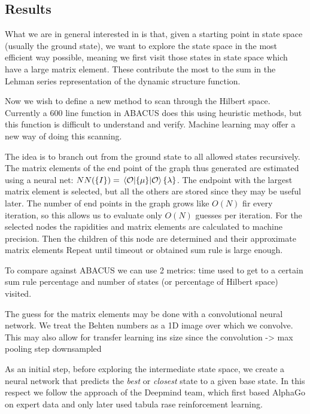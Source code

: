 \documentclass[11pt, a4paper]{report} %
\begin{document}
\subsection{Results}

What we are in general interested in is that, given a starting point in state space (usually the ground state), we want to explore the state space in the most efficient way possible, meaning we first visit those states in state space which have a large matrix element. 
These contribute the most to the sum in the Lehman series representation of the dynamic structure function.





Now we wish to define a new method to scan through the Hilbert space.
Currently a 600 line function in ABACUS does this using heuristic methods, but this function is difficult to understand and verify.
Machine learning may offer a new way of doing this scanning.

The idea is to branch out from the ground state to all allowed states recursively.
The matrix elements of the end point of the graph thus generated are estimated using a neural net: $NN(\{I\}) = \expval{\{\mu\}}{\mathcal{O}}{\{\lambda\}}$.
The endpoint with the largest matrix element is selected, but all the others are stored since they may be useful later.
The number of end points in the graph grows like $O(N)$ fir every iteration, so this allows us to evaluate only $O(N)$ guesses per iteration.
For the selected nodes the rapidities and matrix elements are calculated to machine precision.
Then the children of this node are determined and their approximate matrix elements
Repeat until timeout or obtained sum rule is large enough.

To compare against ABACUS we can use 2 metrics:
time used to get to a certain sum rule percentage and number of states (or percentage of Hilbert space) visited.

The guess for the matrix elements may be done with a convolutional neural network.
We treat the Behten numbers as a 1D image over which we convolve.
This may also allow for transfer learning ins size since the convolution -> max pooling step downsampled



As an initial step, before exploring the intermediate state space, we create a neural network that predicts the \textit{best} or \textit{closest} state to a given base state.
In this respect we follow the approach of the Deepmind team, which first based AlphaGo on expert data and only later used tabula rase reinforcement learning.
\end{document}
